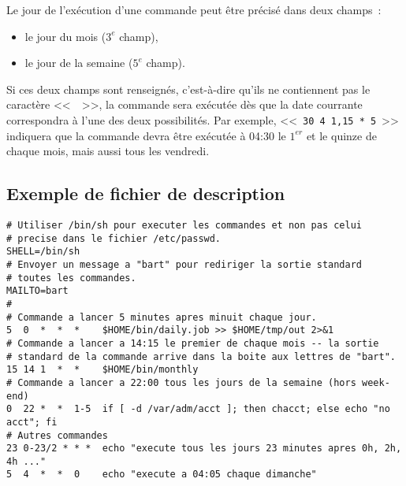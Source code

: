 \begin{remarque}
Le jour de l'ex{\'e}cution d'une commande peut {\^e}tre pr{\'e}cis{\'e} dans deux champs~:
\begin{itemize}
	\item	le jour du mois ($3^e$ champ),
	\item	le jour de la semaine ($5^e$ champ).
\end{itemize}
Si ces deux champs sont renseign{\'e}s, c'est-{\`a}-dire qu'ils ne contiennent pas le
caract{\`e}re <<~{\tt *}~>>, la commande sera ex{\'e}cut{\'e}e d{\`e}s que la date courrante correspondra
{\`a} l'une des deux possibilit{\'e}s. Par exemple, <<~{\tt 30 4 1,15 * 5}~>> indiquera que la
commande devra {\^e}tre ex{\'e}cut{\'e}e {\`a} 04:30 le $1^{er}$ et le quinze de chaque mois, mais
aussi tous les vendredi.
\end{remarque}

\subsection{Exemple de fichier de description}

\begin{example}
\begin{verbatim}
# Utiliser /bin/sh pour executer les commandes et non pas celui
# precise dans le fichier /etc/passwd.
SHELL=/bin/sh
# Envoyer un message a "bart" pour rediriger la sortie standard
# toutes les commandes.
MAILTO=bart
#
# Commande a lancer 5 minutes apres minuit chaque jour.
5  0  *  *  *    $HOME/bin/daily.job >> $HOME/tmp/out 2>&1
# Commande a lancer a 14:15 le premier de chaque mois -- la sortie
# standard de la commande arrive dans la boite aux lettres de "bart".
15 14 1  *  *    $HOME/bin/monthly
# Commande a lancer a 22:00 tous les jours de la semaine (hors week-end)
0  22 *  *  1-5  if [ -d /var/adm/acct ]; then chacct; else echo "no acct"; fi
# Autres commandes
23 0-23/2 * * *  echo "execute tous les jours 23 minutes apres 0h, 2h, 4h ..."
5  4  *  *  0    echo "execute a 04:05 chaque dimanche"
\end{verbatim}
\end{example}
